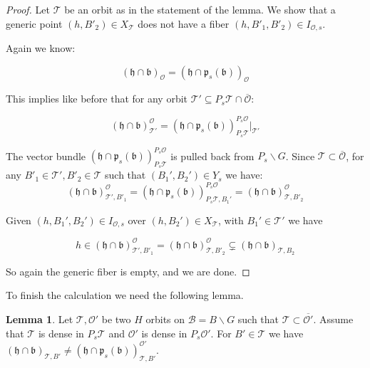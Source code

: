 \documentclass[12pt]{article}
\newcommand{\B}{\mathcal{B}}
\newcommand{\s}{\mathcal{O}}
\theoremstyle{plain}
\theoremstyle{definition}
\newtheorem{lemma}[theorem]{Lemma}
\begin{document}
\begin{proof}

    Let $\mathcal{T}$ be an orbit as in the statement of the lemma. We show that a generic point $(h,B'_{2})\in X_{\mathcal{T}}$ does not have a fiber $(h,B'_{1},B'_{2})\in I_{\s,s}$.

    
    Again we know:


    $$ (\mathfrak{h}\cap \mathfrak{b})_{\mathcal{O}}=(\mathfrak{h}\cap \mathfrak{p}_{s}(\mathfrak{b}))_{\mathcal{O}} $$

    This implies like before that for any orbit $\mathcal{T}'\subseteq P_{s}\mathcal{T} \cap \overline{\mathcal{O}}$:

    $$ (\mathfrak{h} \cap \mathfrak{b})^{\mathcal{O}}_{\mathcal{T}'}=(\mathfrak{h} \cap \mathfrak{p}_{s}(\mathfrak{b}))^{P_{s}\mathcal{O}}_{ P_{s}\mathcal{T}}|_{\mathcal{T}'}$$

    

    
    The vector bundle $(\mathfrak{h} \cap \mathfrak{p}_{s}(\mathfrak{b}))^{P_{s}\mathcal{O}}_{P_{s}\mathcal{T}}$ is pulled back from $P_{s}\backslash G$. Since $\mathcal{T}\subset \overline{\mathcal{O}}$, for any $B'_{1}\in \mathcal{T}', B'_{2}\in \mathcal{T}$ such that $(B_1',B_2')\in Y_s$ we have:
    $$ (\mathfrak{h}\cap\mathfrak{b})^{\mathcal{O}}_{\mathcal{T}',B'_{1}}=(\mathfrak{h} \cap \mathfrak{p}_{s}(\mathfrak{b}))^{P_{s}\mathcal{O}}_{ P_{s}\mathcal{T},B_1'}=(\mathfrak{h}\cap\mathfrak{b})^{\mathcal{O}}_{\mathcal{T},B'_{2}}$$
    
    Given $(h,B_{1}',B_{2}')\in I_{\s,s}$ over $(h,B_{2}')\in X_{\mathcal{T}}$, with $B_{1}'\in \mathcal{T}'$ we have


     $$ h \in (\mathfrak{h} \cap \mathfrak{b})^{\mathcal{O}}_{\mathcal{T}',B'_{1}}= (\mathfrak{h} \cap \mathfrak{b})^{\mathcal{O}}_{\mathcal{T},B'_{2}}\subsetneq (\mathfrak{h} \cap \mathfrak{b})_{\mathcal{T},B_{2}}$$


    So again the generic fiber is empty, and we are done.
    
\end{proof}

To finish the calculation we need the following lemma.

\begin{lemma}\label{lemma:diagram}
    Let $\mathcal{T},\s'$ be two $H$ orbits on $\B=B\backslash G$ such that $\mathcal{T}\subset\overline{\s'}$. Assume that $\mathcal{T}$ is dense in $P_s\mathcal{T}$ and $\s'$ is dense in $P_s\s'$. 
    For $B'\in \mathcal{T}$ we have $(\mathfrak{h}\cap \mathfrak{b})_{\mathcal{T},B'}\neq (\mathfrak{h}\cap \mathfrak{p}_{s}(\mathfrak{b}))^{\mathcal{O}'}_{\mathcal{T},B'}$.
\end{lemma}
\end{document}
